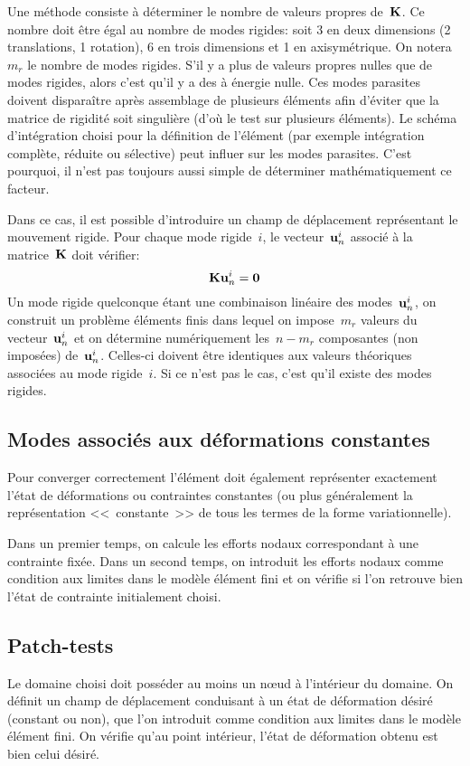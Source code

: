 \medskip
Une méthode consiste à déterminer le nombre de valeurs propres  de~$\MM{K}$.
Ce nombre doit être égal au nombre de modes rigides: soit 3 en deux dimensions (2 translations, 1 rotation),
6 en trois dimensions et 1 en axisymétrique. On notera~$m_r$ le nombre de modes rigides.
S'il y a plus de valeurs propres nulles que de modes rigides, alors c'est qu'il y a des
 à énergie nulle.
Ces modes parasites doivent disparaître après assemblage de plusieurs éléments
afin d'éviter que la matrice de rigidité soit singulière (d'où le test sur plusieurs éléments).
Le schéma d'intégration choisi pour la définition de l'élément (par exemple intégration
complète, réduite ou sélective) peut influer sur les modes parasites.
C'est pourquoi, il n'est pas toujours aussi simple de déterminer mathématiquement
ce facteur.

\medskip
Dans ce cas, il est possible d'introduire un champ de déplacement représentant le
mouvement rigide.
Pour chaque mode rigide~$i$, le vecteur~$\VV{u}^i_n$ associé à la matrice~$\MM{K}$ doit
vérifier:
\begin{equation}\MM{K}\VV{u}^i_n=\VV{0}\end{equation}
Un mode rigide quelconque étant une combinaison linéaire des modes~$\VV{u}^i_n$,
on construit un problème éléments finis dans lequel on impose~$m_r$ valeurs du vecteur~$\VV{u}^i_n$
et on détermine numériquement les~$n-m_r$ composantes (non imposées) de~$\VV{u}^i_n$.
Celles-ci doivent être identiques aux valeurs théoriques associées au mode
rigide~$i$. Si ce n'est pas le cas, c'est qu'il existe des modes rigides.
\medskip
\subsection{Modes associés aux déformations constantes}
Pour converger correctement l'élément doit également représenter
exactement l'état de déformations ou contraintes constantes (ou plus
généralement la représentation <<~constante~>> de tous les termes de la
forme variationnelle).

Dans un premier temps, on calcule les efforts nodaux correspondant à une contrainte fixée.
Dans un second temps, on introduit les efforts nodaux comme condition aux limites dans le modèle
élément fini et on vérifie si l'on retrouve bien l'état de contrainte initialement choisi.

\medskip
\subsection{Patch-tests}
Le domaine choisi doit posséder au moins un nœud à l'intérieur du domaine.
On définit un champ de déplacement conduisant à un état de déformation
désiré (constant ou non), que l'on introduit comme condition aux limites dans le modèle élément fini.
On vérifie qu'au point intérieur, l'état de déformation obtenu est bien celui
désiré.


